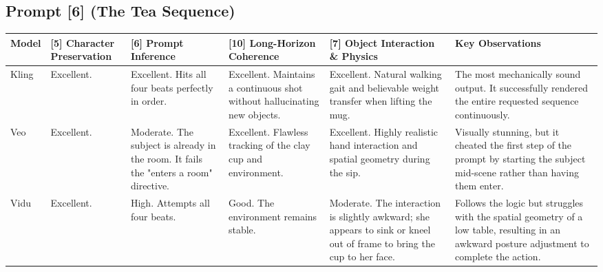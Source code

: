 \documentclass[sigconf]{acmart}
\begin{document}
\subsection*{Prompt [6] (The Tea Sequence)}
\begin{table}[t]
    \centering
    \renewcommand{\arraystretch}{1.3}
    \begin{tabularx}{\textwidth}{| l | >{\raggedright\arraybackslash}X | >{\raggedright\arraybackslash}X | >{\raggedright\arraybackslash}X | >{\raggedright\arraybackslash}X | >{\raggedright\arraybackslash}X |}
        \hline
        \textbf{Model} & \textbf{[5] Character Preservation} & \textbf{[6] Prompt Inference}                                                         & \textbf{[10] Long-Horizon Coherence}                                                                                          & \textbf{[7] Object Interaction \& Physics}                                                                             & \textbf{Key Observations}                                                                                                                    \\ \hline
        Kling          & Excellent.                          & Excellent. Hits all four beats perfectly in order.                                    & Excellent. Maintains a continuous shot without hallucinating new objects.                                                     & Excellent. Natural walking gait and believable weight transfer when lifting the mug.                                   & The most mechanically sound output. It successfully rendered the entire requested sequence continuously.                                     \\ \hline
        Veo            & Excellent.                          & Moderate. The subject is already in the room. It fails the "enters a room" directive. & Excellent. Flawless tracking of the clay cup and environment.                                                                 & Excellent. Highly realistic hand interaction and spatial geometry during the sip.                                      & Visually stunning, but it cheated the first step of the prompt by starting the subject mid-scene rather than having them enter.              \\ \hline
        Vidu           & Excellent.                          & High. Attempts all four beats.                                                        & Good. The environment remains stable.                                                                                         & Moderate. The interaction is slightly awkward; she appears to sink or kneel out of frame to bring the cup to her face. & Follows the logic but struggles with the spatial geometry of a low table, resulting in an awkward posture adjustment to complete the action. \\ \hline

\end{tabularx}
\end{table}
\end{document}
